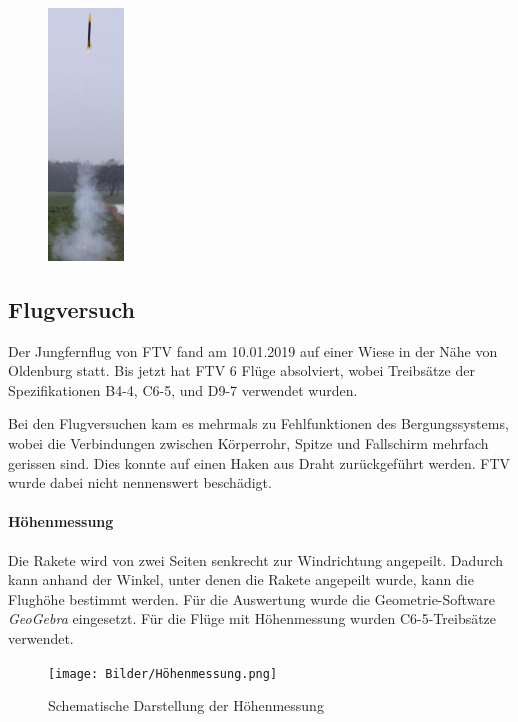 \documentclass[10pt,a4paper]{article}
\begin{document}
\begin{figure}
	\vspace{-12pt}
	\includegraphics[width=0.18\textwidth]{Bilder/Flugversuch-Start.jpg}
	\vspace{-160pt}
\end{figure}

\subsection{Flugversuch}\label{ssec-Flugversuch-Luftwiderstand}

Der Jungfernflug von FTV fand am 10.01.2019 auf einer Wiese in der Nähe von Oldenburg statt. Bis jetzt hat FTV 6 Flüge absolviert, wobei Treibsätze der Spezifikationen \textsf{B4-4}, \textsf{C6-5}, und \textsf{D9-7} verwendet wurden.

Bei den Flugversuchen kam es mehrmals zu Fehlfunktionen des Bergungssystems, wobei die Verbindungen zwischen Körperrohr, Spitze und Fallschirm mehrfach gerissen sind. Dies konnte auf einen Haken aus Draht zurückgeführt werden. FTV wurde dabei nicht nennenswert beschädigt.

\paragraph{Höhenmessung}
Die Rakete wird von zwei Seiten senkrecht zur Windrichtung angepeilt. Dadurch kann anhand der Winkel, unter denen die Rakete angepeilt wurde, kann die Flughöhe bestimmt werden. Für die Auswertung wurde die Geometrie-Software \textit{GeoGebra} eingesetzt. Für die Flüge mit Höhenmessung wurden \textsf{C6-5}-Treibsätze verwendet.

\begin{figure}[H]
	\vspace{-5pt}
	\centering
	\texttt{[image: Bilder/Höhenmessung.png]}
	\caption{Schematische Darstellung der Höhenmessung}
	\vspace{-5pt}
\end{figure}
\end{document}
